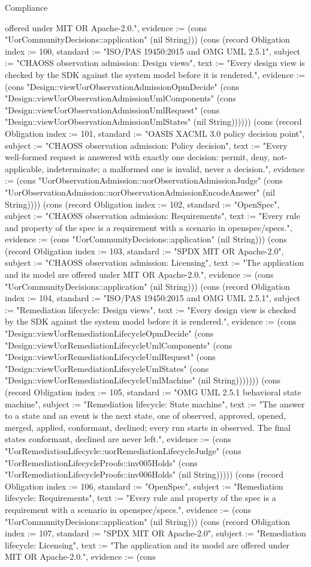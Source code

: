\begin{lexlean}{Compliance}
\begin{semanticmodule}
{offered under MIT OR Apache-2.0.", evidence := (cons "UorCommunityDecisions::application" (nil String))}) (cons (record Obligation {index := 100, standard := "ISO/PAS 19450:2015 and OMG UML 2.5.1", subject := "CHAOSS observation admission: Design views", text := "Every design view is checked by the SDK against the system model before it is rendered.", evidence := (cons "Design::viewUorObservationAdmissionOpmDecide" (cons "Design::viewUorObservationAdmissionUmlComponents" (cons "Design::viewUorObservationAdmissionUmlRequest" (cons "Design::viewUorObservationAdmissionUmlStates" (nil String)))))}) (cons (record Obligation {index := 101, standard := "OASIS XACML 3.0 policy decision point", subject := "CHAOSS observation admission: Policy decision", text := "Every well-formed request is answered with exactly one decision: permit, deny, not-applicable, indeterminate; a malformed one is invalid, never a decision.", evidence := (cons "UorObservationAdmission::uorObservationAdmissionJudge" (cons "UorObservationAdmission::uorObservationAdmissionEncodeAnswer" (nil String)))}) (cons (record Obligation {index := 102, standard := "OpenSpec", subject := "CHAOSS observation admission: Requirements", text := "Every rule and property of the spec is a requirement with a scenario in openspec/specs.", evidence := (cons "UorCommunityDecisions::application" (nil String))}) (cons (record Obligation {index := 103, standard := "SPDX MIT OR Apache-2.0", subject := "CHAOSS observation admission: Licensing", text := "The application and its model are offered under MIT OR Apache-2.0.", evidence := (cons "UorCommunityDecisions::application" (nil String))}) (cons (record Obligation {index := 104, standard := "ISO/PAS 19450:2015 and OMG UML 2.5.1", subject := "Remediation lifecycle: Design views", text := "Every design view is checked by the SDK against the system model before it is rendered.", evidence := (cons "Design::viewUorRemediationLifecycleOpmDecide" (cons "Design::viewUorRemediationLifecycleUmlComponents" (cons "Design::viewUorRemediationLifecycleUmlRequest" (cons "Design::viewUorRemediationLifecycleUmlStates" (cons "Design::viewUorRemediationLifecycleUmlMachine" (nil String))))))}) (cons (record Obligation {index := 105, standard := "OMG UML 2.5.1 behavioral state machine", subject := "Remediation lifecycle: State machine", text := "The answer to a state and an event is the next state, one of observed, approved, opened, merged, applied, conformant, declined; every run starts in observed. The final states conformant, declined are never left.", evidence := (cons "UorRemediationLifecycle::uorRemediationLifecycleJudge" (cons "UorRemediationLifecycleProofs::inv005Holds" (cons "UorRemediationLifecycleProofs::inv006Holds" (nil String))))}) (cons (record Obligation {index := 106, standard := "OpenSpec", subject := "Remediation lifecycle: Requirements", text := "Every rule and property of the spec is a requirement with a scenario in openspec/specs.", evidence := (cons "UorCommunityDecisions::application" (nil String))}) (cons (record Obligation {index := 107, standard := "SPDX MIT OR Apache-2.0", subject := "Remediation lifecycle: Licensing", text := "The application and its model are offered under MIT OR Apache-2.0.", evidence := (cons }
\end{semanticmodule}
\end{lexlean}
